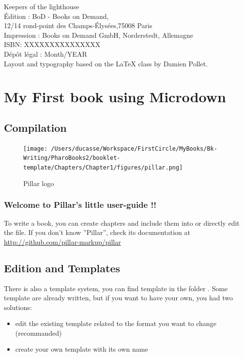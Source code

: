 \documentclass[10pt,twoside,english]{_support/latex/sbabook/sbabook}
\begin{document}
{  \vfill
Keepers of the lighthouse\\
Édition : BoD - Books on Demand,\\
12/14 rond-point des Champs-Élysées,75008 Paris\\
Impression : Books on Demand GmbH, Norderstedt, Allemagne\\
ISBN: XXXXXXXXXXXXXXX\\
Dépôt légal : Month/YEAR\\
Layout and typography based on the  \LaTeX{} class by Damien Pollet.
}


\frontmatter
\pagestyle{plain}

\tableofcontents*

\mainmatter


\part{My First book using Microdown}
\chapter{Compilation}
\begin{figure}[htpb]
\begin{center}
\texttt{[image: /Users/ducasse/Workspace/FirstCircle/MyBooks/Bk-Writing/PharoBooks2/booklet-template/Chapters/Chapter1/figures/pillar.png]}
\caption{Pillar logo}\label{fig}
\end{center}
\end{figure}


\section{Welcome to Pillar's little user-guide !!}
To write a book, you can create chapters and include them into 
or directly edit the file.
If you don't know ''Pillar'', check its documentation at \href{}{\href{http://github.com/pillar-markup/pillar}{http://github.com/pillar-markup/pillar}}

\chapter{Edition and Templates}
There is also a template system, you can find template in the folder .
Some template are already written, but if you want to have your own, you had two solutions:

\begin{itemize}
    \item edit the existing template related to the format you want to change (recommanded)
    \item create your own template with its own name
\end{itemize}
\end{document}
